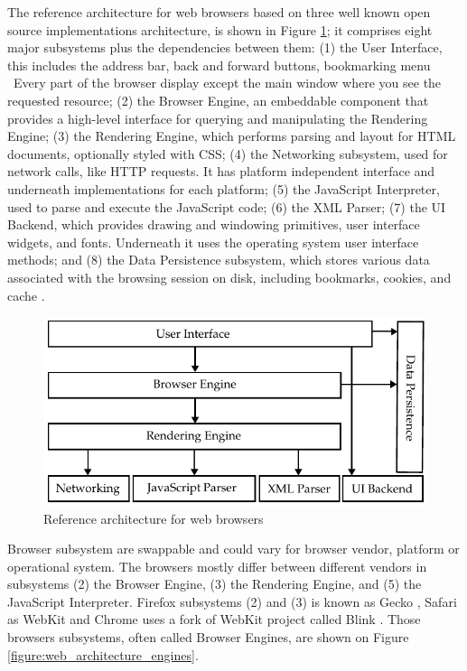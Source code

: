 The reference architecture for web browsers based on three well known open source implementations architecture, is shown in Figure \ref{figure:web_architecture}; it comprises eight major subsystems plus the dependencies between them: (1) the User Interface, this includes the address bar, back and forward buttons, bookmarking menu \etc\ Every part of the browser display except the main window where you see the requested resource; (2) the Browser Engine, an embeddable component that provides a high-level interface for querying and manipulating the Rendering Engine; (3) the Rendering Engine, which performs parsing and layout for HTML documents, optionally styled with CSS; (4) the Networking subsystem, used for network calls, like HTTP requests. It has platform independent interface and underneath implementations for each platform; (5) the JavaScript Interpreter, used to parse and execute the JavaScript code; (6) the XML Parser; (7) the UI Backend, which provides drawing and windowing primitives, user interface widgets, and fonts. Underneath it uses the operating system user interface methods; and (8) the Data Persistence subsystem, which stores various data associated with the browsing session on disk, including bookmarks, cookies, and cache \cite{Grosskurth2005}.

\begin{figure}[!htb]
  \centering
  \includegraphics{chapters/basic_concepts/web_architecture.pdf}
  \caption{Reference architecture for web browsers}
  \label{figure:web_architecture}
\end{figure}

Browser subsystem are swappable and could vary for browser vendor, platform or operational system. The browsers mostly differ between different vendors in subsystems (2) the Browser Engine, (3) the Rendering Engine, and (5) the JavaScript Interpreter. Firefox subsystems (2) and (3) is known as Gecko \cite{Firefox2013} \cite{Gecko2013}, Safari as WebKit \cite{Safari2013} \cite{WebKit2013} and Chrome uses a fork of WebKit project called Blink \cite{Chrome2010} \cite{Blink2013}. Those browsers subsystems, often called Browser Engines, are shown on Figure \ref{figure:web_architecture_engines}.

